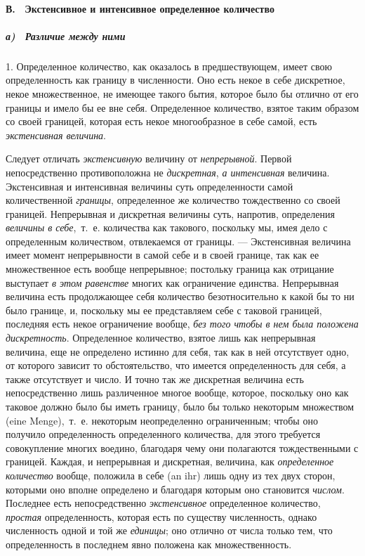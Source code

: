 {\paragraph[В. \ Экстенсивное и интенсивное определенное количество]{В.
\ Экстенсивное и интенсивное определенное количество}
\subparagraph[а) \ Различие между ними]{а) \ Различие между ними}
1. Определенное количество, как оказалось в предшествующем, имеет свою
определенность как границу в численности. Оно есть некое в себе дискретное,
некое множественное, не имеющее такого бытия, которое было бы отлично от
его границы и имело бы ее вне себя. Определенное количество, взятое таким
образом со своей границей, которая есть некое многообразное в себе самой,
есть {\em экстенсивная величина}.

Следует отличать {\em экстенсивную} величину от
{\em непрерывной}. Первой непосредственно
противоположна не {\em дискретная},
{\em а интенсивная} величина. Экстенсивная и
интенсивная величины суть определенности самой количественной
{\em границы}, определенное же количество тождественно
со своей границей. Непрерывная и дискретная величины суть, напротив,
определения {\em величины в себе},~т.~е. количества как
такового, поскольку мы, имея дело с определенным количеством, отвлекаемся
от границы. — Экстенсивная величина имеет момент непрерывности в самой себе
и в своей границе, так как ее множественное есть вообще непрерывное;
постольку граница как отрицание выступает {\em в этом
равенстве} многих как ограничение единства. Непрерывная величина есть
продолжающее себя количество безотносительно к какой бы то ни было границе,
и, поскольку мы ее представляем себе с таковой границей, последняя есть
некое ограничение вообще, {\em без того чтобы в нем
была положена дискретность}. Определенное количество, взятое лишь как
непрерывная величина, еще не определено истинно для себя, так как в ней
отсутствует одно, от которого зависит то обстоятельство, что имеется
определенность для себя, а также отсутствует и число. И точно так же
дискретная величина есть непосредственно лишь различенное многое вообще,
которое, поскольку оно как таковое должно было бы иметь границу, было бы
только некоторым множеством (eine Menge),~т.~е. некоторым неопределенно
ограниченным; чтобы оно получило определенность определенного количества,
для этого требуется совокупление многих воедино, благодаря чему они
полагаются тождественными с границей. Каждая, и непрерывная и дискретная,
величина, как {\em определенное количество} вообще,
положила в себе (an ihr) лишь одну из тех двух сторон, которыми оно вполне
определено и благодаря которым оно становится
{\em числом}. Последнее есть непосредственно
{\em экстенсивное} определенное количество,
{\em простая} определенность, которая есть по существу
численность, однако численность одной и той же
{\em единицы}; оно отлично от числа только тем, что
определенность в последнем явно положена как множественность.

}
